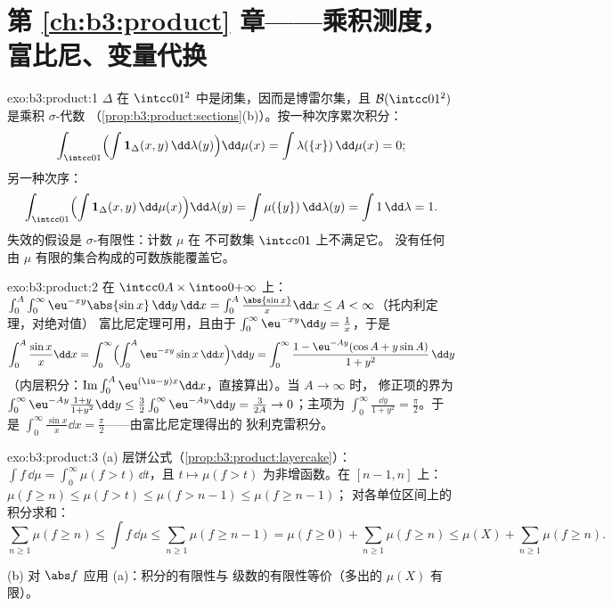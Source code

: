 \section*{第 \ref{ch:b3:product} 章——乘积测度，
富比尼、变量代换}

\begin{solution}{exo:b3:product:1}
$\Delta$ 在 $\intcc01^2$ 中是闭集，因而是博雷尔集，且 $\mathcal
B(\intcc01^2)$ 是乘积 $\sigma$-代数
（\cref{prop:b3:product:sections}(b)）。按一种次序累次积分：
\[
\int_{\intcc01}\Bigl(\int \mathbf 1_\Delta(x,y)
\,\dd\lambda(y)\Bigr)\dd\mu(x)
= \int \lambda(\{x\})\,\dd\mu(x) = 0 ;
\]
另一种次序：
\[
\int_{\intcc01}\Bigl(\int\mathbf
1_\Delta(x,y)\,\dd\mu(x)\Bigr)\dd\lambda(y)
= \int \mu(\{y\})\,\dd\lambda(y) = \int 1\,\dd\lambda = 1 .
\]
失效的假设是 $\sigma$-有限性：计数 $\mu$ 在
不可数集 $\intcc01$ 上不满足它。
没有任何由 $\mu$ 有限的集合构成的可数族能覆盖它。
\end{solution}

\begin{solution}{exo:b3:product:2}
在 $\intcc0A\times\intoo0{+\infty}$ 上：
$\int_0^A\int_0^\infty\eu^{-xy}\abs{\sin x}\,\dd y\,\dd x =
\int_0^A\frac{\abs{\sin x}}x\dd x \leq A < \infty$（托内利定理，对绝对值）
富比尼定理可用，且由于
$\int_0^\infty\eu^{-xy}\dd y = \frac1x$，于是
\[
\int_0^A\frac{\sin x}x\dd x
= \int_0^\infty\Bigl(\int_0^A\eu^{-xy}\sin x\,\dd
x\Bigr)\dd y
= \int_0^\infty \frac{1 - \eu^{-Ay}(\cos A + y\sin A)}{1 +
y^2}\,\dd y
\]
（内层积分：$\operatorname{Im}\int_0^A\eu^{(\iu -
y)x}\dd x$，直接算出）。当 $A \to \infty$ 时，
修正项的界为 $\int_0^\infty\eu^{-Ay}\frac{1 +
y}{1 + y^2}\dd y \leq \frac32\int_0^\infty\eu^{-Ay}\dd y =
\frac3{2A} \to 0$；主项为
$\int_0^\infty\frac{\dd y}{1+y^2} = \frac\pi2$。于是
$\int_0^\infty\frac{\sin x}x\dd x = \frac\pi2$——由富比尼定理得出的
狄利克雷积分。
\end{solution}

\begin{solution}{exo:b3:product:3}
(a) 层饼公式（\cref{prop:b3:product:layercake}）：$\int
f\,\dd\mu = \int_0^\infty\mu(f > t)\,\dd t$，且 $t \mapsto
\mu(f > t)$ 为非增函数。在 $[n-1, n]$ 上：$\mu(f \geq n)
\leq \mu(f > t) \leq \mu(f > n - 1) \leq \mu(f \geq n - 1)$；
对各单位区间上的积分求和：
\[
\sum_{n\geq1}\mu(f \geq n) \leq \int f\,\dd\mu \leq
\sum_{n\geq1}\mu(f \geq n - 1) = \mu(f \geq 0) +
\sum_{n\geq1}\mu(f\geq n) \leq \mu(X) + \sum_{n\geq1}\mu(f\geq
n).
\]

(b) 对 $\abs f$ 应用 (a)：积分的有限性与
级数的有限性等价（多出的 $\mu(X)$ 有限）。
\end{solution}

